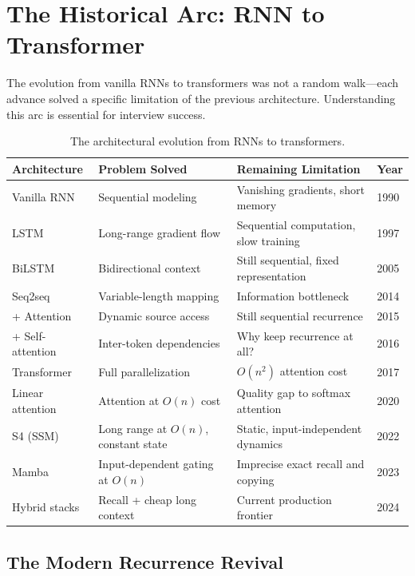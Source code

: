 \section{The Historical Arc: RNN to Transformer}
\label{sec:historical_arc}

The evolution from vanilla RNNs to transformers was not a random walk---each
advance solved a specific limitation of the previous architecture.
Understanding this arc is essential for interview success.

\begin{table}[H]
\centering
\caption{The architectural evolution from RNNs to transformers.}
\label{tab:evolution}
\begin{tabularx}{\textwidth}{lXXl}
\toprule
\textbf{Architecture} & \textbf{Problem Solved} & \textbf{Remaining Limitation}
& \textbf{Year} \\
\midrule
Vanilla RNN & Sequential modeling & Vanishing gradients, short memory & 1990 \\
LSTM & Long-range gradient flow & Sequential computation, slow training & 1997 \\
BiLSTM & Bidirectional context & Still sequential, fixed representation & 2005 \\
Seq2seq & Variable-length mapping & Information bottleneck & 2014 \\
+ Attention & Dynamic source access & Still sequential recurrence & 2015 \\
+ Self-attention & Inter-token dependencies & Why keep recurrence at all? & 2016 \\
Transformer & Full parallelization & $O(n^2)$ attention cost & 2017 \\
Linear attention & Attention at $O(n)$ cost & Quality gap to softmax attention & 2020 \\
S4 (SSM) & Long range at $O(n)$, constant state & Static, input-independent dynamics & 2022 \\
Mamba & Input-dependent gating at $O(n)$ & Imprecise exact recall and copying & 2023 \\
Hybrid stacks & Recall + cheap long context & Current production frontier & 2024 \\
\bottomrule
\end{tabularx}
\end{table}

\subsection{The Modern Recurrence Revival}
\label{sec:recurrence_revival}

